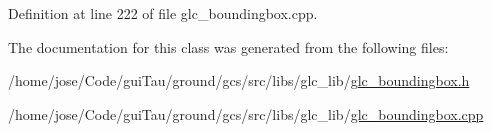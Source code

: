 Definition at line 222 of file glc\-\_\-boundingbox.\-cpp.



The documentation for this class was generated from the following files\-:\begin{DoxyCompactItemize}
\item 
/home/jose/\-Code/gui\-Tau/ground/gcs/src/libs/glc\-\_\-lib/\hyperlink{glc__boundingbox_8h}{glc\-\_\-boundingbox.\-h}\item 
/home/jose/\-Code/gui\-Tau/ground/gcs/src/libs/glc\-\_\-lib/\hyperlink{glc__boundingbox_8cpp}{glc\-\_\-boundingbox.\-cpp}\end{DoxyCompactItemize}
